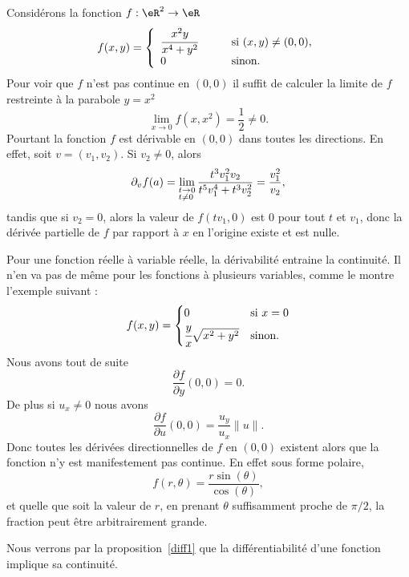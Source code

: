 \begin{example}
	Considérons la fonction \( f:\eR^2\to \eR\)
	\begin{equation}
		f(x,y)=\left\{
		\begin{array}{ll}
			\cfrac{x^2y}{x^4+y^2} \qquad & \textrm{si } (x,y)\neq (0,0), \\
			0                            & \textrm{sinon}.
		\end{array}
		\right.
	\end{equation}
	Pour voir que \( f\) n'est pas continue en \( (0,0)\) il suffit de calculer la limite de \( f\) restreinte à la parabole \( y=x^2\)
	\[
		\lim_{x\to 0} f(x,x^2)=\frac{1}{2} \neq 0.
	\]
	Pourtant la fonction \( f\) est dérivable en \( (0,0)\) dans toutes les directions. En effet, soit \( v=(v_1,v_2)\). Si \( v_2\neq 0\), alors
	\begin{equation}        \label{EQooXOCWooVbCjRd}
		\partial_v f(a)=\lim_{\begin{subarray}{l}
				t\to 0\\ t\neq 0
			\end{subarray}}
		\frac{t^3v_1^2v_2}{t^5 v_1^4+ t^3 v_2^2}=\frac{v_1^2}{v_2},
	\end{equation}
	tandis que si \( v_2=0\), alors la valeur de \( f(tv_1, 0)\)  est \( 0\) pour tout \( t\) et \( v_1\), donc la dérivée partielle de \( f\) par rapport à \( x\) en l'origine existe et est nulle.
\end{example}

\begin{example}
	Pour une fonction réelle à variable réelle, la dérivabilité entraine la continuité. Il n'en va pas de même pour les fonctions à plusieurs variables, comme le montre l'exemple suivant :
	\begin{equation}
		f(x,y)=\begin{cases}
			0                              & \text{si } x=0 \\
			\cfrac{ y }{ x }\sqrt{x^2+y^2} & \text{sinon.}
		\end{cases}
	\end{equation}
	Nous avons tout de suite
	\begin{equation}
		\frac{ \partial f }{ \partial y }(0,0)=0.
	\end{equation}
	De plus si \( u_x\neq 0\) nous avons
	\begin{equation}
		\frac{ \partial f }{ \partial u }(0,0)=\frac{ u_y }{ u_x }\| u \|.
	\end{equation}
	Donc toutes les dérivées directionnelles de \( f\) en \( (0,0)\) existent alors que la fonction n'y est manifestement pas continue. En effet sous forme polaire,
	\begin{equation}
		f(r,\theta)=\frac{ r\sin(\theta) }{ \cos(\theta) },
	\end{equation}
	et quelle que soit la valeur de \( r\), en prenant \( \theta\) suffisamment proche de \( \pi/2\), la fraction peut être arbitrairement grande.

	Nous verrons par la proposition~\ref{diff1} que la différentiabilité d'une fonction implique sa continuité.
\end{example}

